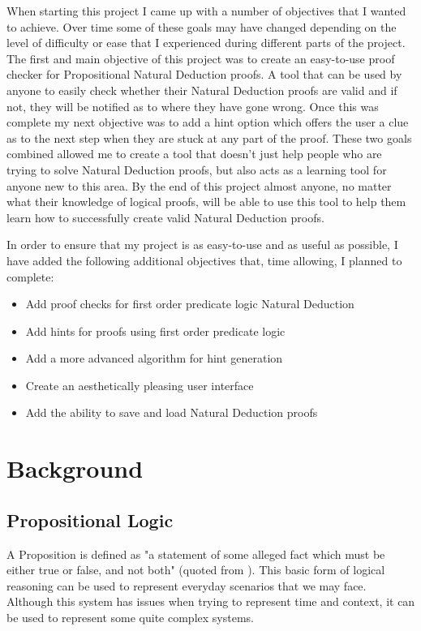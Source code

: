 When starting this project I came up with a number of objectives that I wanted to achieve. Over time some of these goals may have changed depending on the level of difficulty or ease that I experienced during different parts of the project. The first and main objective of this project was to create an easy-to-use proof checker for Propositional Natural Deduction proofs. A tool that can be used by anyone to easily check whether their Natural Deduction proofs are valid and if not, they will be notified as to where they have gone wrong. Once this was complete my next objective was to add a hint option which offers the user a clue as to the next step when they are stuck at any part of the proof. These two goals combined allowed me to create a tool that doesn't just help people who are trying to solve Natural Deduction proofs, but also acts as a learning tool for anyone new to this area. By the end of this project almost anyone, no matter what their knowledge of logical proofs, will be able to use this tool to help them learn how to successfully create valid Natural Deduction proofs.

In order to ensure that my project is as easy-to-use and as useful as possible, I have added the following additional objectives that, time allowing, I planned to complete:
\begin{itemize}
\item Add proof checks for first order predicate logic Natural Deduction
\item Add hints for proofs using first order predicate logic
\item Add a more advanced algorithm for hint generation
\item Create an aesthetically pleasing user interface
\item Add the ability to save and load Natural Deduction proofs
\end{itemize}

\pagebreak

\section{Background \label{Background}}

\subsection{Propositional Logic}

A Proposition is defined as "a statement of some alleged fact which must be either true or false, and not both" (quoted from \cite{ndBook}). This basic form of logical reasoning can be used to represent everyday scenarios that we may face. Although this system has issues when trying to represent time and context, it can be used to represent some quite complex systems.

